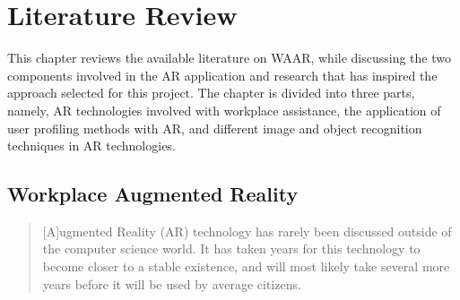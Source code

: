 \documentclass{aifyp}
\begin{document}
\section{Literature Review}
\indent This chapter reviews the available literature on WAAR, while discussing the two components involved in the AR application and research that has inspired the approach selected for this project. The chapter is divided into three parts, namely, AR technologies involved with workplace assistance, the application of user profiling methods with AR, and different image and object recognition techniques in AR technologies.
\subsection{Workplace Augmented Reality}
\begin{quote}
[A]ugmented Reality (AR) technology has rarely been discussed outside  of the computer science world. It has taken years for this technology to become closer to a stable existence, and will most likely take several more years before it will be used by average citizens.\cite{ARInfoForWorkplace}
\end{quote}
\end{document}
